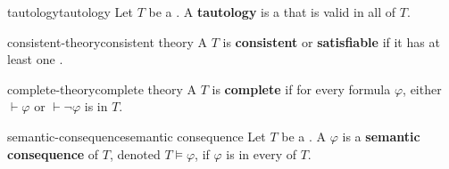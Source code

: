 \begin{topic}{tautology}{tautology}
    Let $T$ be a . A \textbf{tautology} is a  that is valid in all  of $T$.
\end{topic}

\begin{topic}{consistent-theory}{consistent theory}
    A  $T$ is \textbf{consistent} or \textbf{satisfiable} if it has at least one .
\end{topic}

\begin{topic}{complete-theory}{complete theory}
    A  $T$ is \textbf{complete} if for every formula $\varphi$, either $\vdash \varphi$ or $\vdash \neg \varphi$ is in $T$.
\end{topic}

\begin{topic}{semantic-consequence}{semantic consequence}
    Let $T$ be a . A  $\varphi$ is a \textbf{semantic consequence} of $T$, denoted $T \models \varphi$, if $\varphi$ is  in every  of $T$.
\end{topic}

